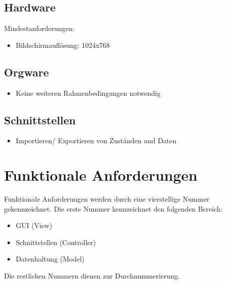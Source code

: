 \documentclass[10pt,a4paper]{article}
\begin{document}
\subsection{Hardware}
Mindestanforderungen:
\begin{itemize}
\item Bildschirmauflösung: 1024x768
\end{itemize}


\subsection{Orgware}
\begin{itemize}
\item Keine weiteren Rahmenbedingungen notwendig
\end{itemize}


\subsection{Schnittstellen}
\begin{itemize}
\item Importieren/ Exportieren von Zuständen und Daten
\end{itemize}


\section{Funktionale Anforderungen}
Funktionale Anforderungen werden durch eine vierstellige Nummer gekennzeichnet. Die erste Nummer kennzeichnet den folgenden Bereich:
\begin{itemize}
	\item GUI (View)
	\item Schnittstellen (Controller)
	\item Datenhaltung (Model)
\end{itemize}
Die restlichen Nummern dienen zur Durchnummerierung.
\end{document}
